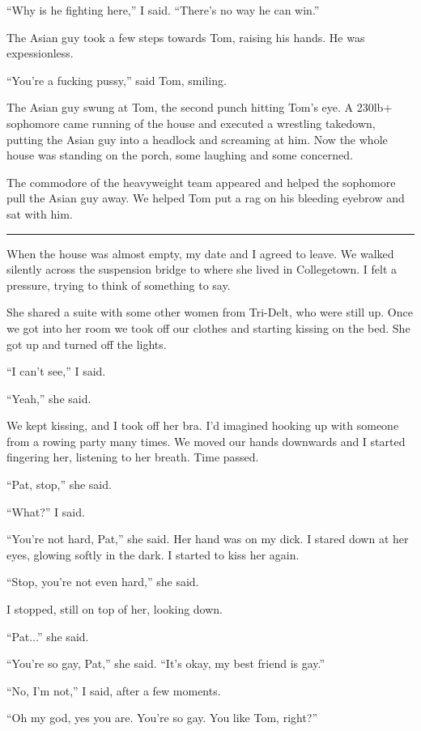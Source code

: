 ``Why is he fighting here,'' I said.  ``There's no way he can win.'' 

The Asian guy took a few steps towards Tom, raising his hands.  He was
expessionless.

``You're a fucking pussy,'' said Tom, smiling. 

The Asian guy swung at Tom, the second punch hitting Tom's eye.  A 230lb+
sophomore came running of the house and executed a wrestling takedown, putting
the Asian guy into a headlock and screaming at him.   Now the whole house was
standing on the porch, some laughing and some concerned.

The commodore of the heavyweight team appeared and helped the sophomore pull the
Asian guy away.  We helped Tom put a rag on his bleeding eyebrow and sat with
him.  

\plainfancybreak{12pt}{2}{* * *}

When the house was almost empty, my date and I agreed to leave.  We walked
silently across the suspension bridge to where she lived in Collegetown.  I felt
a pressure, trying to think of something to say.

She shared a suite with some other women from Tri-Delt, who were still up.  Once
we got into her room we took off our clothes and starting kissing on the bed.
She got up and turned off the lights.

``I can't see,'' I said.  

``Yeah,'' she said.

We kept kissing, and I took off her bra.  I'd imagined hooking up with someone
from a rowing party many times.  We moved our hands downwards and I started
fingering her, listening to her breath.  Time passed.

``Pat, stop,'' she said.

``What?'' I said.

``You're not hard, Pat,'' she said.  Her hand was on my dick.  I stared down at
her eyes, glowing softly in the dark.  I started to kiss her again.

``Stop, you're not even hard,'' she said.

I stopped, still on top of her, looking down.

``Pat...'' she said.

``You're so gay, Pat,'' she said.  ``It's okay, my best friend is gay.''

``No, I'm not,'' I said, after a few moments.

``Oh my god, yes you are.  You're so gay.  You like Tom, right?''

